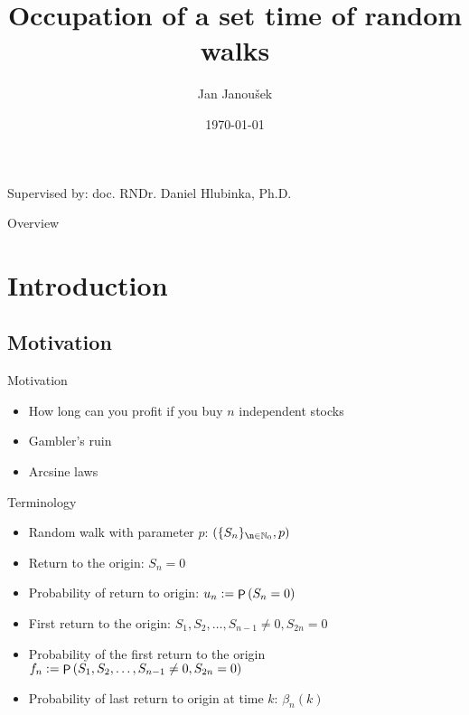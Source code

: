 \documentclass{beamer}
\title[Occupation of a set time of
random walks] {Occupation of a set time of
random walks}
\author{Jan Janoušek}
\date{\today}
\DeclareMathOperator{\pr}{\mathsf{P}}
\begin{document}
\begin{frame}
 \titlepage

{\small
\begin{center}
Supervised by: doc. RNDr. Daniel Hlubinka, Ph.D.
\end{center}
}

\end{frame}

\begin{frame}{Overview}
 \tableofcontents
\end{frame}


\section{Introduction}



\subsection{Motivation}

\begin{frame}{Motivation}
 \begin{itemize}
\item<1->{How long can you profit if you buy $n$ independent stocks}
\item<2->{Gambler's ruin}
\item<3->{Arcsine laws}
\end{itemize}


\end{frame}


\begin{frame}{Terminology}
\begin{itemize}
\item<1-> Random walk with parameter $p$:  $\left(\{S_n\}_{\n \in \mathbb{N}_0} , p \right)$
\item<2-> Return to the origin: $S_n=0$
\item<3-> Probability of return to origin: $u_n\dosad \pr\left(S_n=0\right)$
\item<4-> First return to the origin: $S_1, S_2, \ldots, S_{n-1}\neq 0, S_{2n}=0$
\item<5-> Probability of the first return to the origin $f_n\dosad \pr\left(S_1, S_2, \ldots, S_{n-1}\neq 0, S_{2n}=0\right)$
\item<6-> Probability of last return to origin at time $k$: $\beta_{n}\left( k\right)$
\end{itemize}
\end{frame}
\end{document}
